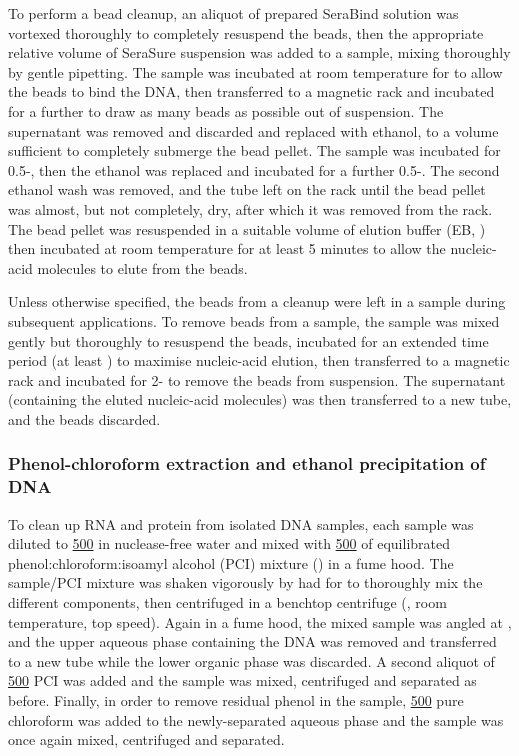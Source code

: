 To perform a bead cleanup, an aliquot of prepared SeraBind solution was vortexed thoroughly to completely resuspend the beads, then the appropriate relative volume of SeraSure suspension was added to a sample, mixing thoroughly by gentle pipetting. The sample was incubated at room temperature for  to allow the beads to bind the DNA, then transferred to a magnetic rack and incubated for a further  to draw as many beads as possible out of suspension. The supernatant was removed and discarded and replaced with  ethanol, to a volume sufficient to completely submerge the bead pellet. The sample was incubated for 0.5-, then the ethanol was replaced and incubated for a further 0.5-. The second ethanol wash was removed, and the tube left on the rack until the bead pellet was almost, but not completely, dry, after which it was removed from the rack. The bead pellet was resuspended in a suitable volume of elution buffer (EB, ) then incubated at room temperature for at least 5 minutes to allow the nucleic-acid molecules to elute from the beads.

Unless otherwise specified, the beads from a cleanup were left in a sample during subsequent applications. To remove beads from a sample, the sample was mixed gently but thoroughly to resuspend the beads, incubated for an extended time period (at least ) to maximise nucleic-acid elution, then transferred to a magnetic rack and incubated for 2- to remove the beads from suspension. The supernatant (containing the eluted nucleic-acid molecules) was then transferred to a new tube, and the beads discarded.

\subsubsection{Phenol-chloroform extraction and ethanol precipitation of DNA}
\label{sec:methods_molec_standard_phenol}


To clean up RNA and protein from isolated DNA samples, each sample was diluted to \ul{500} in nuclease-free water and mixed with \ul{500} of equilibrated phenol:chloroform:isoamyl alcohol (PCI) mixture () in a fume hood. The sample/PCI mixture was shaken vigorously by had for  to thoroughly mix the different components, then centrifuged in a benchtop centrifuge (, room temperature, top speed). Again in a fume hood, the mixed sample was angled at , and the upper aqueous phase containing the DNA was removed and transferred to a new tube while the lower organic phase was discarded. A second aliquot of \ul{500} PCI was added and the sample was mixed, centrifuged and separated as before. Finally, in order to remove residual phenol in the sample, \ul{500} pure chloroform was added to the newly-separated aqueous phase and the sample was once again mixed, centrifuged and separated. 

